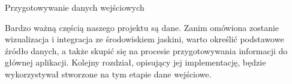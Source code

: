\begin{chapter}{Przygotowywanie danych wejściowych}
	\newcommand{\chapterPath}{rozdzialy/3_dane}

	Bardzo ważną częścią naszego projektu są dane. Zanim omówiona zostanie wizualizacja i integracja ze środowiskiem jaskini, warto określić podstawowe źródło danych, a także skupić się na procesie przygotowywania informacji do głównej aplikacji. Kolejny rozdział, opisujący jej implementację, będzie wykorzystywał stworzone na tym etapie dane wejściowe.

	
	
	
	
	
\end{chapter}
